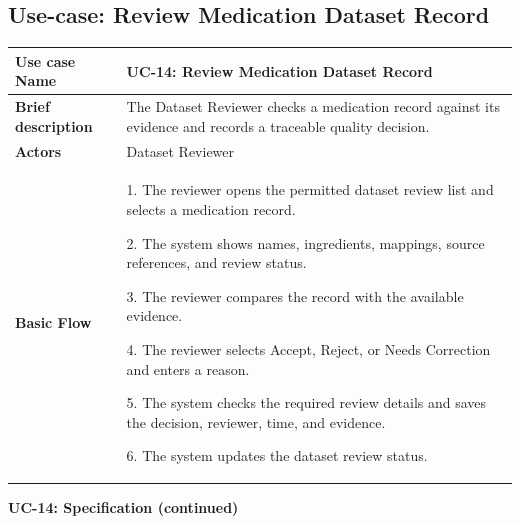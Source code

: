 
\clearpage
\subsection{Use-case: Review Medication Dataset Record}
\label{uc:uc-14}

\begin{longtable}{|p{}|p{}|}
\hline
\textbf{Use case Name} & UC-14: Review Medication Dataset Record \\ \hline
\textbf{Brief description} & The Dataset Reviewer checks a medication record against its evidence and records a traceable quality decision. \\ \hline
\textbf{Actors} & Dataset Reviewer \\ \hline
\textbf{Basic Flow} &
1. The reviewer opens the permitted dataset review list and selects a medication record.\par
2. The system shows names, ingredients, mappings, source references, and review status.\par
3. The reviewer compares the record with the available evidence.\par
4. The reviewer selects Accept, Reject, or Needs Correction and enters a reason.\par
5. The system checks the required review details and saves the decision, reviewer, time, and evidence.\par
6. The system updates the dataset review status.
\\ \hline
\end{longtable}
\clearpage
\noindent\textbf{UC-14: Specification (continued)}
